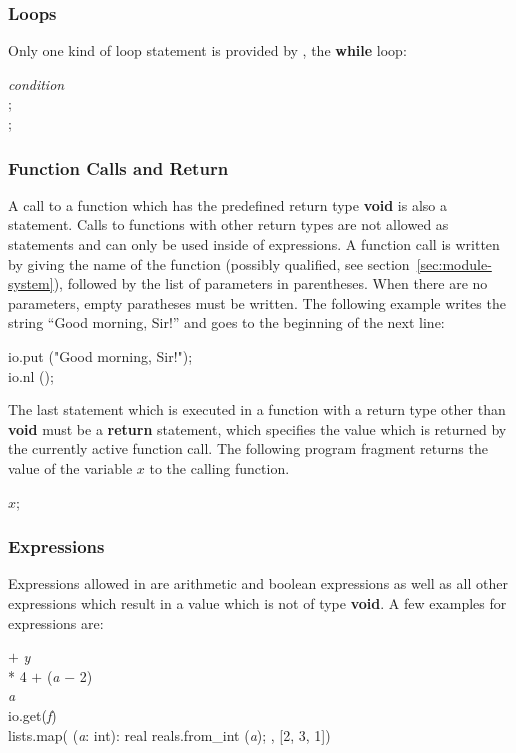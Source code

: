 \subsubsection{Loops}

Only one kind of loop statement is provided by \turtle{}, the {\bf
  while} loop:
%
\begin{ttlprog}
\>\ttlWhile{} {\em condition} \ttlDo{}\\
\>;\\
\>\ttlEnd{};
\end{ttlprog}

\subsubsection{Function Calls and Return}

A call to a function which has the predefined return type {\bf void}
is also a statement.  Calls to functions with other return types are
not allowed as statements and can only be used inside of expressions.
A function call is written by giving the name of the function
(possibly qualified, see section~\ref{sec:module-system}), followed by
the list of parameters in parentheses.  When there are no parameters,
empty paratheses must be written.  The following example writes the
string ``Good morning, Sir!'' \!\!and goes to the beginning of the next
line:
%
\begin{ttlprog}
  \>io.put ("Good morning, Sir!");\\
  \>io.nl ();
\end{ttlprog}
%
The last statement which is executed in a function with a return type
other than {\bf void} must be a {\bf return} statement, which
specifies the value which is returned by the currently active function
call.  The following program fragment returns the value of the
variable $x$ to the calling function.
%
\begin{ttlprog}
\>\ttlReturn{} $x$;
\end{ttlprog}

\subsubsection{Expressions}

Expressions allowed in \turtle{} are arithmetic and boolean
expressions as well as all other expressions which result in a value
which is not of type {\bf void}.  A few examples for expressions are:
%
\begin{ttlprog}
 $+$ {\em y}\\
 * 4 $+$ ({\em a} $-$ 2)\\
\>\ttlTrue{} \ttlAnd{} \ttlNot{} {\em a}\\
\>io.get({\em f})\\
\>lists.map(\ttlFun{} ({\em a}: int): real \ttlReturn{} reals.from\_int ({\em a}); \ttlEnd{}, [2, 3, 1])\\
\>[2.0, 3.0, 1.0]
\end{ttlprog}

